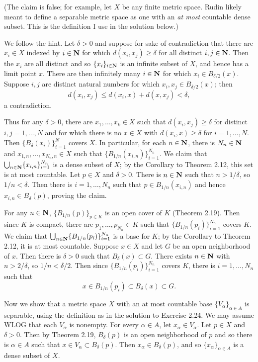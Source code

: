 \begin{ex}
(The claim is false; for example, let $X$ be any finite metric space. Rudin likely meant to define a separable metric space as one with an \emph{at most} countable dense subset. This is the definition I use in the solution below.)

We follow the hint. Let $\delta > 0$ and suppose for sake of contradiction that there are $x_i \in X$ indexed by $i \in \mathbf{N}$ for which $d(x_i, x_j) \geq \delta$ for all distinct $i, j \in \mathbf{N}$. Then the $x_i$ are all distinct and so $\{x_i\}_{i \in \mathbf{N}}$ is an infinite subset of $X$, and hence has a limit point $x$. There are then infinitely many $i \in \mathbf{N}$ for which $x_i \in B_{\delta/2}(x)$. Suppose $i, j$ are distinct natural numbers for which $x_i, x_j \in B_{\delta/2}(x)$; then \[d(x_i, x_j) \leq d(x_i, x) + d(x, x_j) < \delta,\] a contradiction.

Thus for any $\delta > 0$, there are $x_1, \ldots, x_k \in X$ such that $d(x_i, x_j) \geq \delta$ for distinct $i, j = 1, \ldots, N$ and for which there is no $x \in X$ with $d(x_i, x) \geq \delta$ for $i = 1, \ldots, N$. Then $\{B_{\delta}(x_i)\}_{i = 1}^N$ covers $X$. In particular, for each $n \in \mathbf{N}$, there is $N_n \in \mathbf{N}$ and $x_{1, n}, \ldots, x_{N_n, n} \in X$ such that $\{B_{1/n}(x_{i, n})\}_{i = 1}^{N_n}$. We claim that $\bigcup_{n \in \mathbf{N}}\{x_{i, n}\}_{i = 1}^{N_n}$ is a dense subset of $X$; by the Corollary to Theorem 2.12, this set is at most countable. Let $p \in X$ and $\delta > 0$. There is $n \in \mathbf{N}$ such that $n > 1/\delta$, so $1/n < \delta$. Then there is $i = 1, \ldots, N_n$ such that $p \in B_{1/n}(x_{i, n})$ and hence $x_{i, n} \in B_{\delta}(p)$, proving the claim.
\end{ex}

\begin{ex}
For any $n \in \mathbf{N}$, $\{B_{1/n}(p)\}_{p \in K}$ is an open cover of $K$ (Theorem 2.19). Then since $K$ is compact, there are $p_1, \ldots, p_{N_n} \in K$ such that $\{B_{1/n}(p_i)\}_{i = 1}^{N_n}$ covers $K$. We claim that $\bigcup_{n \in \mathbf{N}}\{B_{1/n}(p_i)\}_{i = 1}^{N_n}$ is a base for $K$; by the Corollary to Theorem 2.12, it is at most countable. Suppose $x \in X$ and let $G$ be an open neighborhood of $x$. Then there is $\delta > 0$ such that $B_{\delta}(x) \subset G$. There exists $n \in \mathbf{N}$ with $n > 2/\delta$, so $1/n < \delta/2$. Then since $\{B_{1/n}(p_i)\}_{i = 1}^{N_n}$ covers $K$, there is $i = 1, \ldots, N_n$ such that \[x \in B_{1/n}(p_i) \subset B_{\delta}(x) \subset G.\]

Now we show that a metric space $X$ with an at most countable base $\{V_{\alpha}\}_{\alpha \in A}$ is separable, using the definition as in the solution to Exercise 2.24. We may assume WLOG that each $V_{\alpha}$ is nonempty. For every $\alpha \in A$, let $x_{\alpha} \in V_{\alpha}$. Let $p \in X$ and $\delta > 0$. Then by Theorem 2.19, $B_{\delta}(p)$ is an open neighborhood of $p$ and so there is $\alpha \in A$ such that $x \in V_{\alpha} \subset B_{\delta}(p)$. Then $x_{\alpha} \in B_{\delta}(p)$, and so $\{x_{\alpha}\}_{\alpha \in A}$ is a dense subset of $X$.
\end{ex}

